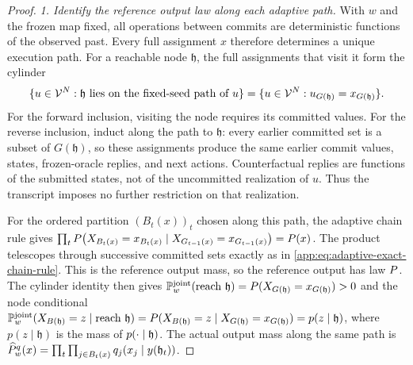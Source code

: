 \begin{proof}
{\color{red}

\emph{1. Identify the reference output law along each adaptive path.}
With $w$ and the frozen map fixed, all operations between commits are
deterministic functions of the observed past.  Every full assignment $x$
therefore determines a unique execution path.  For a reachable node
$\mathfrak h$, the full assignments that visit it form the cylinder
\[
 \{u\in\Vocab^N:\mathfrak h\text{ lies on the fixed-seed path of }u\}
 =
 \{u\in\Vocab^N:u_{G(\mathfrak h)}=x_{G(\mathfrak h)}\}.
\]
For the forward inclusion, visiting the node requires its committed
values.  For the reverse inclusion, induct along the path to
$\mathfrak h$: every earlier committed set is a subset of
$G(\mathfrak h)$, so these assignments produce the same earlier commit
values, states, frozen-oracle replies, and next actions.
Counterfactual replies are functions of the submitted states, not of the
uncommitted realization of $u$.  Thus the transcript imposes no further
restriction on that realization.

For the ordered partition $(B_t(x))_t$ chosen along this path, the adaptive
chain rule gives $\prod_t \TargetLaw\!\left(
  X_{B_t(x)}=x_{B_t(x)}\mid
  X_{G_{t-1}(x)}=x_{G_{t-1}(x)}\right)=\TargetLaw(x)$.
The product telescopes through successive committed sets exactly as in
\eqref{app:eq:adaptive-exact-chain-rule}.
This is the reference output mass, so the reference output has law
$\TargetLaw$.  The cylinder identity then gives
$\JointReferenceLaw{w}(\text{reach }\mathfrak h)
 =\TargetLaw(X_{G(\mathfrak h)}=x_{G(\mathfrak h)})>0$ and the node
conditional
$\JointReferenceLaw{w}(X_{B(\mathfrak h)}=z\mid\text{reach }\mathfrak h)
 =\TargetLaw(X_{B(\mathfrak h)}=z\mid
                     X_{G(\mathfrak h)}=x_{G(\mathfrak h)})
 =p(z\mid\mathfrak h)$,
where $p(z\mid\mathfrak h)$ is the mass of
$\JointBatchLaw{\mathfrak h}$.
The actual output mass along the same path is
$\SamplerOutputLaw{w}{\FrozenOracle}(x)
 =\prod_t\prod_{j\in B_t(x)}
  \OracleRowMass{y(\mathfrak h_t)}{j}{x_j}$.

}
\end{proof}
